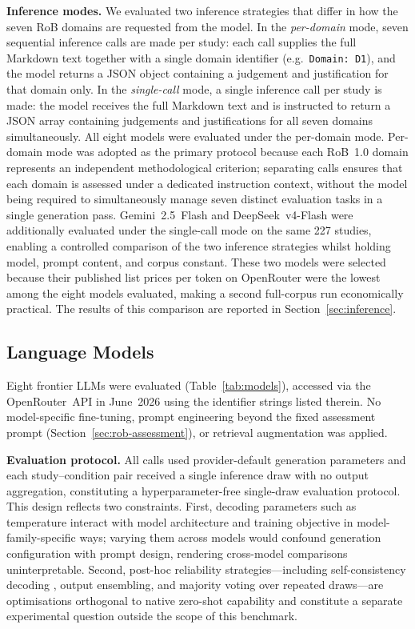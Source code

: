\documentclass[../main.tex]{subfiles}
\begin{document}
\textbf{Inference modes.}
We evaluated two inference strategies that differ in how the seven RoB domains
are requested from the model.
In the \emph{per-domain} mode, seven sequential inference calls are made per
study: each call supplies the full Markdown text together with a single domain
identifier (e.g.\ \texttt{Domain: D1}), and the model returns a JSON object
containing a judgement and justification for that domain only.
In the \emph{single-call} mode, a single inference call per study is made:
the model receives the full Markdown text and is instructed to return a JSON
array containing judgements and justifications for all seven domains
simultaneously.
All eight models were evaluated under the per-domain mode.
Per-domain mode was adopted as the primary protocol because each RoB~1.0
domain represents an independent methodological criterion; separating calls
ensures that each domain is assessed under a dedicated instruction context,
without the model being required to simultaneously manage seven distinct
evaluation tasks in a single generation pass.
Gemini~2.5~Flash and DeepSeek~v4-Flash were additionally evaluated under the
single-call mode on the same 227 studies, enabling a controlled comparison of
the two inference strategies whilst holding model, prompt content, and corpus
constant.
These two models were selected because their published list prices per token on
OpenRouter were the lowest among the eight models evaluated, making a second
full-corpus run economically practical.
The results of this comparison are reported in Section~\ref{sec:inference}.

\subsection{Language Models}
\label{sec:models}

Eight frontier LLMs were evaluated (Table~\ref{tab:models}), accessed via the
OpenRouter~API in June~2026 using the identifier strings listed therein.
No model-specific fine-tuning, prompt engineering beyond the fixed assessment
prompt (Section~\ref{sec:rob-assessment}), or retrieval augmentation was applied.

\textbf{Evaluation protocol.}
All calls used provider-default generation parameters and each study--condition
pair received a single inference draw with no output aggregation, constituting
a hyperparameter-free single-draw evaluation protocol.
This design reflects two constraints.
First, decoding parameters such as temperature interact with model architecture
and training objective in model-family-specific ways; varying them across models
would confound generation configuration with prompt design, rendering
cross-model comparisons uninterpretable.
Second, post-hoc reliability strategies---including self-consistency decoding
\citep{Wang2023}, output ensembling, and majority voting over repeated
draws---are optimisations orthogonal to native zero-shot capability and
constitute a separate experimental question outside the scope of this benchmark.
\end{document}

